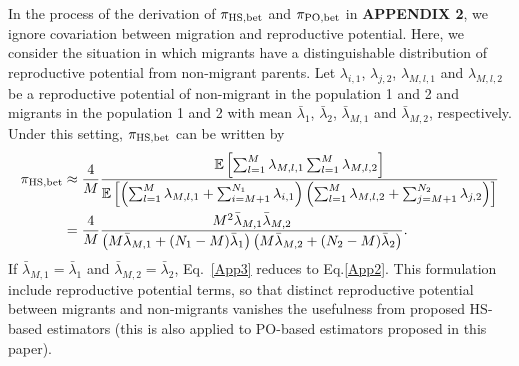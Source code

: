 \documentclass[12pt, English]{article}
\begin{document}
\begin{spacing}{1.9}
In the process of the derivation of $\pi_{\rm HS,bet}$ and $\pi_{\rm PO,bet}$ in {\bf APPENDIX 2}, we ignore covariation between migration and reproductive potential. Here, we consider the situation in which migrants have a distinguishable distribution of reproductive potential from non-migrant parents. Let $\lambda_{i,1}$, $\lambda_{j,2}$, $\lambda_{M,l,1}$ and $\lambda_{M,l,2}$ be a reproductive potential of non-migrant in the population 1 and 2 and migrants in the population 1 and 2 with mean ${\bar \lambda_{1}}$, ${\bar \lambda_{2}}$, ${\bar \lambda_{M,1}}$ and ${\bar \lambda_{M,2}}$, respectively. Under this setting, $\pi_{\rm HS,bet}$ can be written by
\begin{align}
\pi_{\rm HS,bet} &\approx \frac{4}{M}  \frac{ \mathbb{E}\left[ \sum_{l=1}^M \lambda_{M,l,1} \sum_{l=1}^M \lambda_{M,l,2} \right]} {\mathbb{E}\left[ \left(\sum_{l=1}^{M} \lambda_{M,l,1} + \sum_{i=M+1}^{N_1} \lambda_{i,1}\right) \left(\sum_{l=1}^{M} \lambda_{M,l,2} + \sum_{j=M+1}^{N_2} \lambda_{j,2}\right) \right] }\nonumber\\ 
&= \frac{4}{M} \frac{ M^2 {\bar \lambda_{M,1}} {\bar \lambda_{M,2}} } { \left( M {\bar \lambda_{M,1}} + (N_1 - M) {\bar \lambda_1} \right) \left( M {\bar \lambda_{M,2}} + (N_2 - M) {\bar \lambda_2} \right)}.
\label{App3}
\end{align}
If ${\bar \lambda_{M,1}} = {\bar \lambda_{1}}$ and ${\bar \lambda_{M,2}} = {\bar \lambda_{2}}$, Eq.~\ref{App3} reduces to Eq.\ref{App2}. This formulation include reproductive potential terms, so that distinct reproductive potential between migrants and non-migrants vanishes the usefulness from proposed HS-based estimators (this is also applied to PO-based estimators proposed in this paper). 

\clearpage




\end{spacing}
\end{document}
